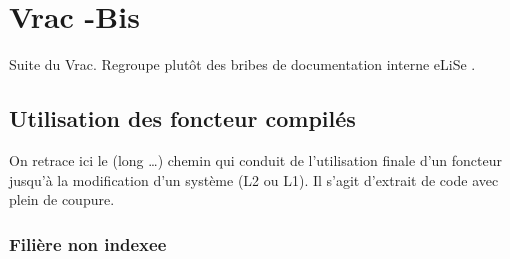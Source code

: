 \chapter{Vrac -Bis }

Suite du Vrac. Regroupe plut\^ot des  bribes de documentation interne 
eLiSe .


\section{Utilisation des foncteur compil\'es}

On retrace ici le (long \dots) chemin qui conduit de l'utilisation
finale d'un foncteur jusqu'\`a la modification d'un syst\`eme (L2 ou L1).
Il s'agit d'extrait de code avec plein de coupure.

\subsection {Fili\`ere non indexee}

